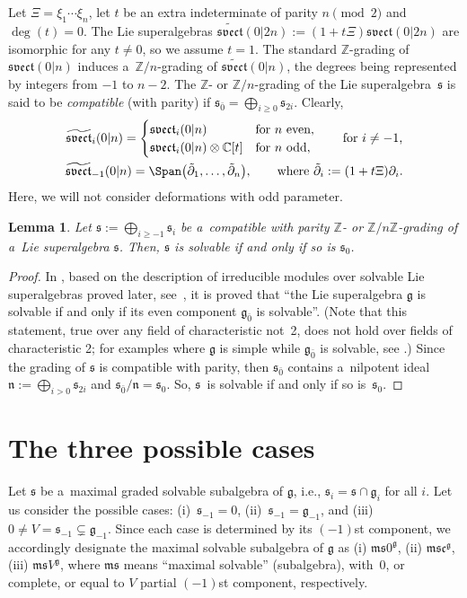 \documentclass[10pt,a4paper]{amsart}
\newcommand{\del}{\partial}
\newcommand {\Cee} {{\mathbb C}}
\newcommand {\Zee} {{\mathbb Z}}
\newcommand {\fc} {{\mathfrak{c}}}
\newcommand {\fg} {{\mathfrak{g}}} %
\newcommand {\fm} {{\mathfrak{m}}}
\newcommand {\fn} {{\mathfrak{n}}}
\newcommand {\fs} {{\mathfrak{s}}}
\newcommand {\fsvect} {{\mathfrak{svect}}}
\newcommand {\ev} {{\bar0}}
\newcommand {\<} [2] {{\left.\vphantom{#2}\right.^{#1\!}\!{#2}}}
\numberwithin{equation}{section}
\newtheorem{Lemma}[Theorem]{Lemma}
\begin{document}
Let $\Xi=\xi_1\cdots\xi_n$, let $t$ be an extra indeterminate of parity $n\pmod 2$ and $\deg(t)=0$. The Lie superalgebras $\widetilde{\fsvect}(0|2n):=(1+t\Xi)\fsvect(0|2n)$ are isomorphic for any $t\neq 0$, so we assume $t=1$. The standard $\Zee$-grading of $\fsvect(0|n)$ induces a~$\Zee/n$-grading of $\widetilde{\fsvect}(0|n)$, the degrees being represented by integers from $-1$ to $n-2$. The $\Zee$- or $\Zee/n$-grading of the Lie superalgebra~$\fs$ is said to be \textit{compatible} (with parity) if $\fs_\ev=\bigoplus_{i\geq 0} \fs_{2i}$. Clearly,
\begin{gather*}
\widetilde{\fsvect}_i(0|n)=\begin{cases}\fsvect_i(0|n)&\text{for $n$ even},\\
\fsvect_i(0|n)\otimes \Cee[t]&\text{for $n$ odd},\end{cases} \qquad \text{for $i\neq -1$,}\\ \widetilde{\fsvect}_{-1}(0|n)=\Span\bigl(\tilde{\del}_1,\dots,\tilde{\del}_n\bigr), \qquad \text{where $\tilde{\del}_i:=(1+t\Xi)\del_i$}.
\end{gather*}
Here, we will not consider deformations with odd parameter.

\begin{Lemma}\label{L1} Let $\fs:=\bigoplus_{i\geq -1} \fs_i$ be a~compatible with parity $\Zee$- or $\Zee/n\Zee$-grading of a~Lie superalgebra $\fs$. Then, $\fs$ is solvable if and only if so is $\fs_0$.
\end{Lemma}

\begin{proof} In \cite[Proposition~1.3.3]{K}, based on the description of irreducible modules over solvable Lie superalgebras proved later, see~\cite{Sg}, it is proved that ``the Lie superalgebra $\fg$ is solvable if and only if its even component $\fg_\ev$ is solvable''. (Note that this statement, true over any field of characteristic not~2, does not hold over fields of characteristic 2; for examples where $\fg$ is simple while $\fg_\ev$ is solvable, see \cite{BGLLS, BGL}.) Since the grading of $\fs$ is compatible with parity, then $\fs_\ev$ contains a~nilpotent ideal $\fn:=\bigoplus_{i>0} \fs_{2i}$ and $\fs_\ev/\fn=\fs_0$. So, $\fs$~is solvable if and only if so is~$\fs_0$.
\end{proof}

\section{The three possible cases}\label{3cases}
Let $\fs$ be a~maximal graded solvable subalgebra of $\fg$, i.e., $\fs_i=\fs\cap\fg_i$ for all $i$. Let us consider the possible cases:
(i)~$\fs_{-1}=0$, (ii)~$\fs_{-1}=\fg_{-1}$, and (iii)~$0\neq V=\fs_{-1}\subsetneq\fg_{-1}$. Since each case is determined by its $(-1)$st component, we accordingly designate the maximal solvable subalgebra of $\fg$ as (i) $\fm\fs0^{\fg}$, (ii) $\fm\fs\fc^{\fg}$, (iii) $\fm\fs V^{\fg}$, where $\fm\fs$ means ``maximal solvable'' (subalgebra),
with~0, or complete, or equal to $V$ partial $(-1)$st component, respectively.
\end{document}
